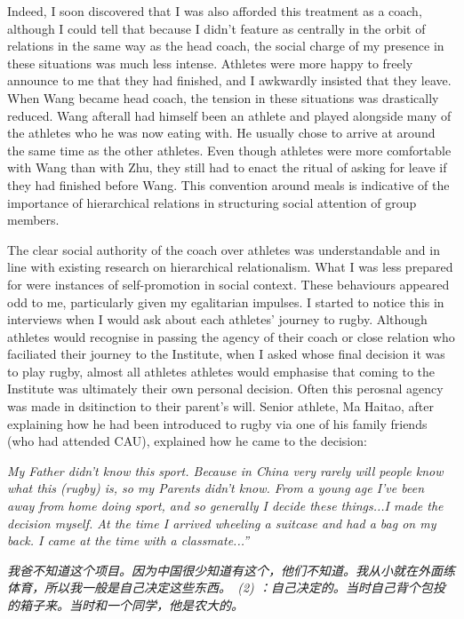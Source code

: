 Indeed, I soon discovered that I was also afforded this treatment as a coach, although I could tell that because I didn't feature as centrally in the orbit of relations in the same way as the head coach, the social charge of my presence in these situations was much less intense.  Athletes were more happy to freely announce to me that they had finished, and I awkwardly insisted that they leave.  When Wang became head coach, the tension in these situations was drastically reduced. Wang afterall had himself been an athlete and played alongside many of the athletes who he was now eating with.  He usually chose to arrive at around the same time as the other athletes.  Even though athletes were more comfortable with Wang than with Zhu, they still had to enact the ritual of asking for leave if they had finished before Wang.  This convention around meals is indicative of the importance of hierarchical relations in structuring social attention of group members.


The clear social authority of the coach over athletes was understandable and in line with existing research on hierarchical relationalism.  What I was less prepared for were instances of self-promotion in social context.  These behaviours appeared odd to me, particularly given my egalitarian impulses.  I started to notice this in interviews when I would ask about each athletes' journey to rugby.  Although athletes would recognise in passing the agency of their coach or close relation who faciliated their journey to the Institute, when I asked whose final decision it was to play rugby, almost all athletes athletes would emphasise that coming to the Institute was ultimately their own personal decision.  Often this perosnal agency was made in dsitinction to their parent's will.  Senior athlete, Ma Haitao, after explaining how he had been introduced to rugby via one of his family friends (who had attended CAU), explained how he came to the decision:

\textit{My Father didn't know this sport.  Because in China very rarely will people know what this (rugby) is, so my Parents didn't know. From a young age I've been away from home doing sport, and so generally I decide these things...I made the decision myself.  At the time I arrived wheeling a suitcase and had a bag on my back.  I came at the time with a classmate...''}

\textit{我爸不知道这个项目。因为中国很少知道有这个，他们不知道。我从小就在外面练体育，所以我一般是自己决定这些东西。 (2) ：自己决定的。当时自己背个包投的箱子来。当时和一个同学，他是农大的。}

